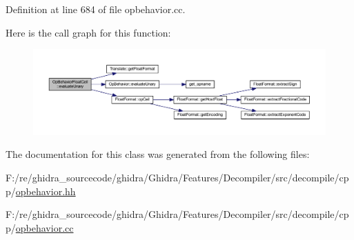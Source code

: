 Definition at line 684 of file opbehavior.\+cc.

Here is the call graph for this function\+:
\nopagebreak
\begin{figure}[H]
\begin{center}
\leavevmode
\includegraphics[width=350pt]{class_op_behavior_float_ceil_a681f8504d31c13890468933fd370bf21_cgraph}
\end{center}
\end{figure}


The documentation for this class was generated from the following files\+:\begin{DoxyCompactItemize}
\item 
F\+:/re/ghidra\+\_\+sourcecode/ghidra/\+Ghidra/\+Features/\+Decompiler/src/decompile/cpp/\mbox{\hyperlink{opbehavior_8hh}{opbehavior.\+hh}}\item 
F\+:/re/ghidra\+\_\+sourcecode/ghidra/\+Ghidra/\+Features/\+Decompiler/src/decompile/cpp/\mbox{\hyperlink{opbehavior_8cc}{opbehavior.\+cc}}\end{DoxyCompactItemize}
